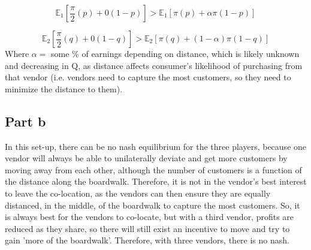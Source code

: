 \documentclass{article}
\begin{document}
\[
\mathbb{E}_1 \left[ \frac{\pi}{2}(p) + 0(1-p) \right] > \mathbb{E}_1 \left[ \pi(p) + \alpha \pi (1-p) \right]
\]

\[
\mathbb{E}_2 \left[ \frac{\pi}{2}(q) + 0(1-q) \right] > \mathbb{E}_2 \left[ \pi(q) + (1-\alpha) \pi (1-q) \right]
\]
 Where $\alpha =$ some \% of earnings depending on distance, which is likely unknown and decreasing in  Q,  as distance affects consumer's likelihood of purchasing from that vendor (i.e. vendors need to capture the most customers, so they need to minimize the distance to them). 

\subsection{Part b}
In this set-up, there can be no nash equilibrium for the three players, because one vendor will always be able to unilaterally deviate and get more customers by moving away from each other, although the number of customers is a function of the distance along the boardwalk. Therefore, it is not in the vendor's best interest to leave the co-location, as the vendors can then ensure they are equally distanced, in the middle, of the boardwalk to capture the most customers. So, it is always best for the vendors to co-locate, but with a third vendor, profits are reduced as they share, so there will still exist an incentive to move and try to gain 'more of the boardwalk'. Therefore, with three vendors, there is no nash. 
\end{document}
